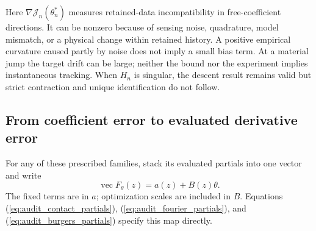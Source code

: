\documentclass[journal]{IEEEtran}
\begin{document}
Here $\nabla\mathcal J_n(\theta_n^*)$ measures retained-data
incompatibility in free-coefficient directions. It can be nonzero because
of sensing noise, quadrature, model mismatch, or a physical change within
retained history. A positive empirical curvature caused partly by noise
does not imply a small bias term. At a material jump the target drift can
be large; neither the bound nor the experiment implies instantaneous
tracking. When $H_n$ is singular, the descent result remains valid but
strict contraction and unique identification do not follow.

\subsection{From coefficient error to evaluated derivative error}
For any of these prescribed families, stack its evaluated partials into
one vector and write
\begin{equation}
 \operatorname{vec}F_\theta(z)=a(z)+B(z)\theta.
 \label{eq:audit_partial_map}
\end{equation}
The fixed terms are in $a$; optimization scales are included in $B$.
Equations (\ref{eq:audit_contact_partials}),
(\ref{eq:audit_fourier_partials}), and
(\ref{eq:audit_burgers_partials}) specify this map directly.
\end{document}
